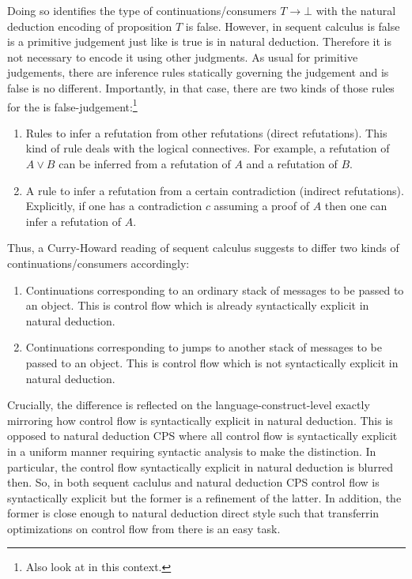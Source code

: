 Doing so identifies the type of continuations/consumers $T \to \bot$ with the natural deduction encoding of {\glqq}proposition $T$ is false{\grqq}.
However, in sequent calculus {\glqq}is false{\grqq} is a primitive judgement just like {\glqq}is true{\grqq} is in natural deduction.
Therefore it is not necessary to encode it using other judgments.
As usual for primitive judgements, there are inference rules statically governing the judgement and {\glqq}is false{\grqq} is no different.
Importantly, in that case, there are two kinds of those rules for the {\glqq}is false{\grqq}-judgement:\footnote{Also look at \cite{zeilberger} in this context.}
\begin{enumerate}
  \item
    Rules to infer a refutation from other refutations (direct refutations).
    This kind of rule deals with the logical connectives.
    For example, a refutation of $A \lor B$ can be inferred from a refutation of $A$ and a refutation of $B$.
  \item
    A rule to infer a refutation from a certain contradiction (indirect refutations).
    Explicitly, if one has a contradiction $c$ assuming a proof of $A$ then one can infer a refutation of $A$.
\end{enumerate}
Thus, a Curry-Howard reading of sequent calculus suggests to differ two kinds of continuations/consumers accordingly:
\begin{enumerate}
  \item
    Continuations corresponding to an ordinary stack of messages to be passed to an object. This is control flow which is already syntactically explicit in natural deduction.
  \item
    Continuations corresponding to jumps to another stack of messages to be passed to an object. This is control flow which is not syntactically explicit in natural deduction.
\end{enumerate}
Crucially, the difference is reflected on the language-construct-level exactly mirroring how control flow is syntactically explicit in natural deduction.
This is opposed to natural deduction CPS where all control flow is syntactically explicit in a uniform manner requiring syntactic analysis to make the distinction.
In particular, the control flow syntactically explicit in natural deduction is blurred then.
So, in both sequent caclulus and natural deduction CPS control flow is syntactically explicit but the former is a refinement of the latter.
In addition, the former is close enough to natural deduction direct style such that transferrin optimizations on control flow from there is an easy task.
